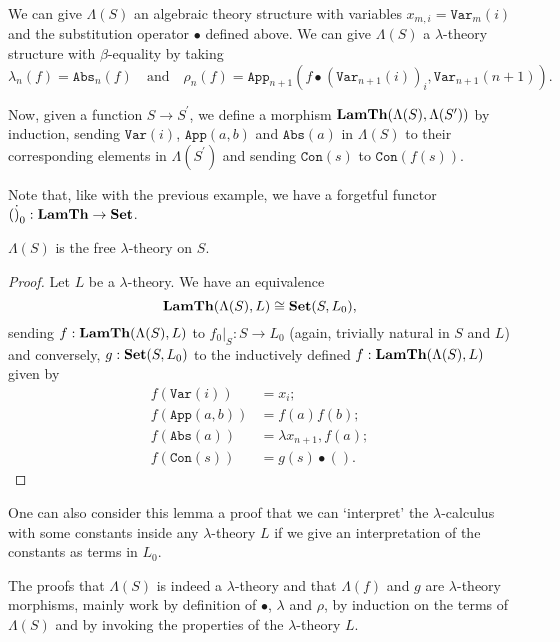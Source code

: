 \begin{example}\label{ex:free-lambda-theory}
  We can give $ \Lambda(S) $ an algebraic theory structure with variables $ x_{m, i} = \mathtt{Var}_m(i) $ and the substitution operator $ \bullet $ defined above. We can give $ \Lambda(S) $ a $ \lambda $-theory structure with $ \beta $-equality by taking
  \[ \lambda_n(f) = \mathtt{Abs}_n(f) \quad \text{and} \quad \rho_n(f) = \mathtt{App}_{n + 1}(f \bullet (\mathtt{Var}_{n + 1}(i))_i, \mathtt{Var}_{n + 1}(n + 1)). \]

  Now, given a function $ S \to S^\prime $, we define a morphism $ \mathbf{LamTh}(\Lambda(S), \Lambda(S^\prime)) $ by induction, sending $ \mathtt{Var}(i) $, $ \mathtt{App}(a, b) $ and $ \mathtt{Abs}(a) $ in $ \Lambda(S) $ to their corresponding elements in $ \Lambda(S^\prime) $ and sending $ \mathtt{Con}(s) $ to $ \mathtt{Con}(f(s)) $.
\end{example}

Note that, like with the previous example, we have a forgetful functor $ (\dot)_0: \mathbf{LamTh} \to \mathbf{Set} $.

\begin{lemma}
  $ \Lambda(S) $ is the free $ \lambda $-theory on $ S $.
\end{lemma}
\begin{proof}
  Let $ L $ be a $ \lambda $-theory. We have an equivalence
  \[ \mathbf{LamTh}(\Lambda(S), L) \cong \mathbf{Set}(S, L_0), \]
  sending $ f: \mathbf{LamTh}(\Lambda(S), L) $ to $ f_0 \vert_S: S \to L_0 $ (again, trivially natural in $ S $ and $ L $) and conversely, $ g: \mathbf{Set}(S, L_0) $ to the inductively defined $ f: \mathbf{LamTh}(\Lambda(S), L) $ given by
  \begin{align*}
    f(\mathtt{Var}(i)) &= x_i;\\
    f(\mathtt{App}(a, b)) &= f(a) f(b);\\
    f(\mathtt{Abs}(a)) &= \lambda x_{n + 1}, f(a);\\
    f(\mathtt{Con}(s)) &= g(s) \bullet ().
  \end{align*}
\end{proof}

\begin{remark}
  One can also consider this lemma a proof that we can `interpret' the $ \lambda $-calculus with some constants inside any $ \lambda $-theory $ L $ if we give an interpretation of the constants as terms in $ L_0 $.
\end{remark}

The proofs that $ \Lambda(S) $ is indeed a $ \lambda $-theory and that $ \Lambda(f) $ and $ g $ are $ \lambda $-theory morphisms, mainly work by definition of $ \bullet $, $ \lambda $ and $ \rho $, by induction on the terms of $ \Lambda(S) $ and by invoking the properties of the $ \lambda $-theory $ L $.

